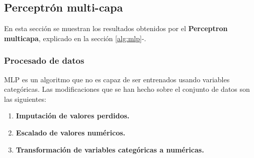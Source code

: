 \subsection{Perceptrón multi-capa}
En esta sección se muestran los resultados obtenidos por el \textbf{Perceptron multicapa}, explicado en la sección \ref{alg:mlp}-.
\subsubsection*{Procesado de datos}
MLP es un algoritmo que no es capaz de ser entrenados usando variables categóricas. Las modificaciones que se han hecho sobre el conjunto de datos son las siguientes:
\begin{enumerate}
	\item \textbf{Imputación de valores perdidos.}
	\item \textbf{Escalado de valores numéricos.}
	\item \textbf{Transformación de variables categóricas a numéricas.}
\end{enumerate}
